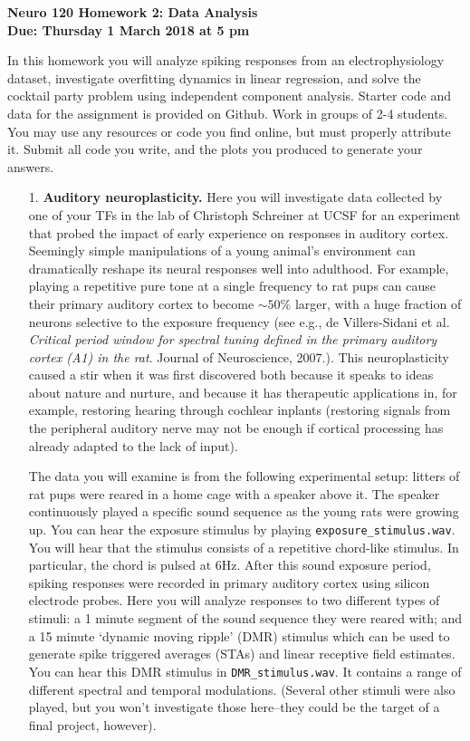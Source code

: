 \documentclass{article}
\begin{document}
\begin{flushleft}
\textbf{Neuro 120 Homework 2: Data Analysis\\
Due: Thursday 1 March 2018 at 5 pm}\\
\end{flushleft}

In this homework you will analyze spiking responses from an electrophysiology dataset, investigate overfitting dynamics in linear regression, and solve the cocktail party problem using independent component analysis. Starter code and data for the assignment is provided on Github. Work in groups of 2-4 students. You may use any resources or code you find online, but must properly attribute it. Submit all code you write, and the plots you produced to generate your answers.


\begin{itemize}

\item[1.]  \textbf{Auditory neuroplasticity.} Here you will investigate data collected by one of your TFs in the lab of Christoph Schreiner at UCSF for an experiment that probed the impact of early experience on responses in auditory cortex. Seemingly simple manipulations of a young animal's environment can dramatically reshape its neural responses well into adulthood. For example, playing a repetitive pure tone at a single frequency to rat pups can cause their primary auditory cortex to become $\sim50$\% larger, with a huge fraction of neurons selective to the exposure frequency (see e.g., de Villers-Sidani et al. \textit{Critical period window for spectral tuning defined in the primary auditory cortex (A1) in the rat}. Journal of Neuroscience, 2007.). This neuroplasticity caused a stir when it was first discovered both because it speaks to ideas about nature and nurture, and because it has therapeutic applications in, for example, restoring hearing through cochlear inplants (restoring signals from the peripheral auditory nerve may not be enough if cortical processing has already adapted to the lack of input). 

The data you will examine is from the following experimental setup: litters of rat pups were reared in a home cage with a speaker above it.  The speaker continuously played a specific sound sequence as the young rats were growing up. You can hear the exposure stimulus by playing \verb|exposure_stimulus.wav|. You will hear that the stimulus consists of a repetitive chord-like stimulus. In particular, the chord is pulsed at 6Hz. After this sound exposure period, spiking responses were recorded in primary auditory cortex using silicon electrode probes. Here you will analyze responses to two different types of stimuli: a 1 minute segment of the sound sequence they were reared with; and a 15 minute `dynamic moving ripple' (DMR) stimulus which can be used to generate spike triggered averages (STAs) and linear receptive field estimates. You can hear this DMR stimulus in \verb|DMR_stimulus.wav|. It contains a range of different spectral and temporal modulations. (Several other stimuli were also played, but you won't investigate those here--they could be the target of a final project, however). 


\end{itemize}
\end{document}
